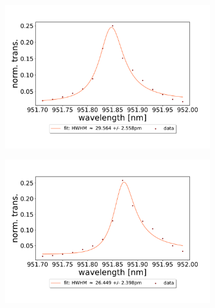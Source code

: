 \begin{figure}[h!]
\begin{subfigure}[b]{0.49\textwidth}
    \end{subfigure}
    \begin{subfigure}[b]{0.49\textwidth}
        \includegraphics[width=\textwidth]{figures/results/double fano fits/1000um_M3:M5_fit_3.pdf}
        \caption{}
        \label{fig:1000um_M3:M5_fit_3}
    \end{subfigure}
    \begin{subfigure}[b]{0.49\textwidth}
        \includegraphics[width=\textwidth]{figures/results/double fano fits/1000um_M3:M5_fit_4.pdf}
        \caption{}
        \label{fig:1000um_M3:M5_fit_4}
    \end{subfigure}
    \begin{subfigure}[b]{0.49\textwidth}

\end{subfigure}
\end{figure}
